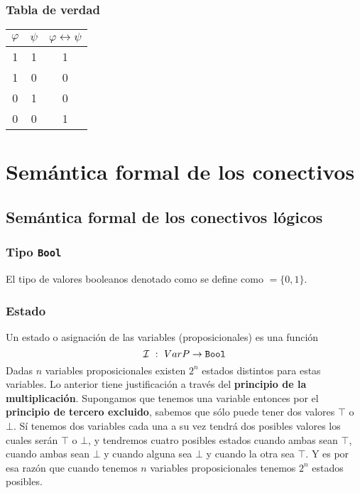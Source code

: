 \documentclass[a4paper]{article}
\begin{document}
\subsubsection{Tabla de verdad}
\begin{center}
    \begin{tabular}{ccc}
    $\varphi$ & \(\psi\) & $\varphi \leftrightarrow \psi$\\
    \midrule
    1 & 1 & 1 \\
    1 & 0 & 0 \\
    0 & 1 & 0 \\
    0 & 0 & 1 \\
    \end{tabular}
\end{center}
\section{Semántica formal de los conectivos}
\subsection{Semántica formal de los conectivos lógicos}
\subsubsection{Tipo \texttt{Bool}}
El tipo de valores booleanos denotado como  se define como 
$=\{0,1\}$.
\subsubsection{Estado}
Un estado o asignación de las variables (proposicionales) es
una función
\[
    \mathcal{I} \ : \ VarP \to \text{\texttt{Bool}}
\]
Dadas $n$ variables proposicionales existen $2^n$ estados distintos
para estas variables. Lo anterior tiene justificación a través del 
\textbf{principio de la multiplicación}. Supongamos que tenemos 
una variable entonces por el \textbf{principio de tercero excluido}, 
sabemos que sólo puede tener dos valores \(\top\) o \(\bot\). Sí tenemos 
dos variables cada una a su vez tendrá dos posibles valores los cuales serán
\(\top\) o \(\bot\), y tendremos cuatro posibles estados cuando ambas sean 
\(\top\), cuando ambas sean \(\bot\) y cuando alguna sea \(\bot\) y cuando la 
otra sea \(\top\). Y es por esa razón que cuando tenemos \(n\) variables 
proposicionales tenemos \(2^{n}\) estados posibles.
\end{document}
